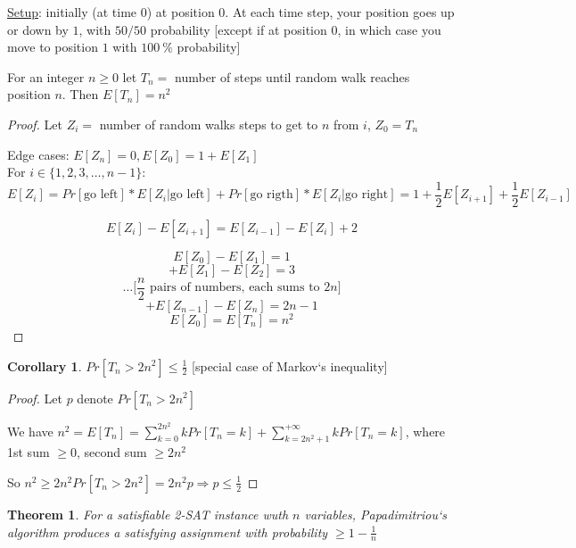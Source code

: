 \documentclass[a4paper,12pt]{article}
\theoremstyle{plain}
\newtheorem*{theorem}{Theorem}
\theoremstyle{definition}
\newtheorem*{corollary}{Corollary}
\theoremstyle{remark}
\begin{document}
\underline{Setup}: initially (at time $0$) at position $0$. At each time step, your position goes up or down by $1$, with $50/50$ probability [except if at position $0$, in which case you move to position $1$ with $100~\%$ probability]

For an integer $n \geq 0$ let $T_n =$ number of steps until random walk reaches position $n$. Then $E[T_n] = n^2$
\begin{proof}
Let $Z_i =$ number of random walks steps to get to $n$ from $i$, $Z_0 = T_n$

Edge cases: $E[Z_n] = 0, E[Z_0] = 1 + E[Z_1]$\\

For $i \in \{1, 2, 3, \dots, n-1\}$:
\[
E[Z_i] = Pr[\text{go left}]*E[Z_i | \text{go left}] + Pr[\text{go rigth}]*E[Z_i | \text{go right}] = 1 + \frac{1}{2}E[Z_{i+1}] + \frac{1}{2}E[Z_{i-1}]
\]

\[
E[Z_i] - E[Z_{i+1}] = E[Z_{i-1}] - E[Z_i] + 2
\]

\[E[Z_0] - E[Z_1] = 1\]
\[+ E[Z_1] - E[Z_2] = 3\]
\[\dots \text{[$\frac{n}{2}$ pairs of numbers, each sums to $2n$]}\]
\[+ E[Z_{n-1}] - E[Z_n] = 2n - 1\]
\[ E[Z_0] = E[T_n] = n^2\]
\end{proof}

\begin{corollary} $Pr[T_n > 2n^2] \leq \frac{1}{2}$ [special case of Markov`s inequality]\end{corollary}

\begin{proof}
Let $p$ denote $Pr[T_n > 2n^2]$

We have $n^2 = E[T_n] = \sum\limits_{k = 0}^{2n^2} k Pr[T_n = k] + \sum\limits_{k = 2n^2 + 1}^{+\infty} k Pr[T_n = k]$, where 1st sum $\geq 0$, second sum $\geq 2n^2$

So $n^2 \geq 2n^2 Pr[T_n > 2n^2] = 2n^2 p \Rightarrow p \leq \frac{1}{2}$
\end{proof}

\begin{theorem}
For a satisfiable 2-SAT instance wuth $n$ variables, Papadimitriou`s algorithm produces a satisfying assignment with probability $\geq 1 - \frac{1}{n}$
\end{theorem}
\end{document}
